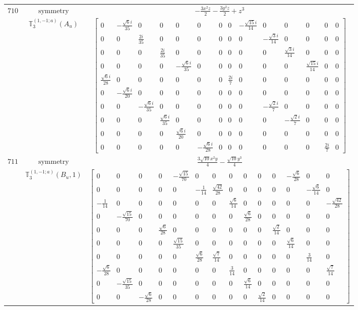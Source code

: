 \documentclass[fleqn,8pt,landscape]{jsarticle}
\begin{document}
\begin{longtable}{ccc}
$ 710 $ & $ \text{symmetry} $ & $ - \frac{3 x^{2} z}{2} - \frac{3 y^{2} z}{2} + z^{3} $ \\
$  $ & $ \mathbb{T}_{3}^{(1,-1;a)}(A_{u}) $ & $ \begin{bmatrix} 0 & - \frac{\sqrt{6} i}{35} & 0 & 0 & 0 & 0 & 0 & 0 & - \frac{\sqrt{15} i}{14} & 0 & 0 & 0 & 0 & 0 \\ 0 & 0 & \frac{2 i}{35} & 0 & 0 & 0 & 0 & 0 & 0 & - \frac{\sqrt{3} i}{14} & 0 & 0 & 0 & 0 \\ 0 & 0 & 0 & \frac{2 i}{35} & 0 & 0 & 0 & 0 & 0 & 0 & \frac{\sqrt{3} i}{14} & 0 & 0 & 0 \\ 0 & 0 & 0 & 0 & - \frac{\sqrt{6} i}{35} & 0 & 0 & 0 & 0 & 0 & 0 & \frac{\sqrt{15} i}{14} & 0 & 0 \\ \frac{\sqrt{6} i}{28} & 0 & 0 & 0 & 0 & 0 & 0 & \frac{2 i}{7} & 0 & 0 & 0 & 0 & 0 & 0 \\ 0 & - \frac{\sqrt{6} i}{20} & 0 & 0 & 0 & 0 & 0 & 0 & 0 & 0 & 0 & 0 & 0 & 0 \\ 0 & 0 & - \frac{\sqrt{6} i}{35} & 0 & 0 & 0 & 0 & 0 & 0 & - \frac{\sqrt{2} i}{7} & 0 & 0 & 0 & 0 \\ 0 & 0 & 0 & \frac{\sqrt{6} i}{35} & 0 & 0 & 0 & 0 & 0 & 0 & - \frac{\sqrt{2} i}{7} & 0 & 0 & 0 \\ 0 & 0 & 0 & 0 & \frac{\sqrt{6} i}{20} & 0 & 0 & 0 & 0 & 0 & 0 & 0 & 0 & 0 \\ 0 & 0 & 0 & 0 & 0 & - \frac{\sqrt{6} i}{28} & 0 & 0 & 0 & 0 & 0 & 0 & \frac{2 i}{7} & 0 \end{bmatrix} $ \\ \hline
$ 711 $ & $ \text{symmetry} $ & $ \frac{3 \sqrt{10} x^{2} y}{4} - \frac{\sqrt{10} y^{3}}{4} $ \\
$  $ & $ \mathbb{T}_{3}^{(1,-1;a)}(B_{u},1) $ & $ \begin{bmatrix} 0 & 0 & 0 & 0 & - \frac{\sqrt{15}}{70} & 0 & 0 & 0 & 0 & 0 & 0 & - \frac{\sqrt{6}}{28} & 0 & 0 \\ 0 & 0 & 0 & 0 & 0 & - \frac{1}{14} & \frac{\sqrt{42}}{28} & 0 & 0 & 0 & 0 & 0 & - \frac{\sqrt{6}}{14} & 0 \\ - \frac{1}{14} & 0 & 0 & 0 & 0 & 0 & 0 & \frac{\sqrt{6}}{14} & 0 & 0 & 0 & 0 & 0 & - \frac{\sqrt{42}}{28} \\ 0 & - \frac{\sqrt{15}}{70} & 0 & 0 & 0 & 0 & 0 & 0 & \frac{\sqrt{6}}{28} & 0 & 0 & 0 & 0 & 0 \\ 0 & 0 & 0 & \frac{\sqrt{6}}{28} & 0 & 0 & 0 & 0 & 0 & 0 & \frac{\sqrt{2}}{14} & 0 & 0 & 0 \\ 0 & 0 & 0 & 0 & \frac{\sqrt{15}}{35} & 0 & 0 & 0 & 0 & 0 & 0 & \frac{\sqrt{6}}{14} & 0 & 0 \\ 0 & 0 & 0 & 0 & 0 & \frac{\sqrt{6}}{28} & \frac{\sqrt{7}}{14} & 0 & 0 & 0 & 0 & 0 & \frac{3}{14} & 0 \\ - \frac{\sqrt{6}}{28} & 0 & 0 & 0 & 0 & 0 & 0 & \frac{3}{14} & 0 & 0 & 0 & 0 & 0 & \frac{\sqrt{7}}{14} \\ 0 & - \frac{\sqrt{15}}{35} & 0 & 0 & 0 & 0 & 0 & 0 & \frac{\sqrt{6}}{14} & 0 & 0 & 0 & 0 & 0 \\ 0 & 0 & - \frac{\sqrt{6}}{28} & 0 & 0 & 0 & 0 & 0 & 0 & \frac{\sqrt{2}}{14} & 0 & 0 & 0 & 0 \end{bmatrix} $ \\ \hline

\end{longtable}
\end{document}
